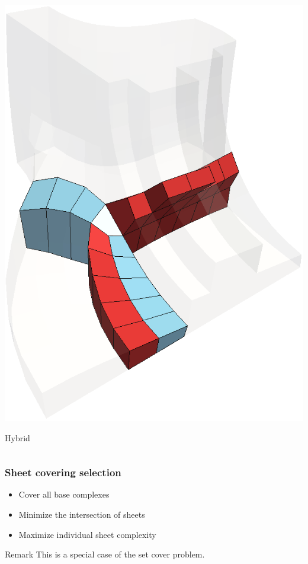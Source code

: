 \documentclass[12pt]{beamer}
\begin{document}
\begin{frame}
\begin{columns}
\begin{column}{0.3\textwidth}
      \includegraphics[width=\textwidth]{./images/sheet-hybrid.png}
      \begin{center}Hybrid\end{center}
    \end{column}
  \end{columns}
\end{frame}

\begin{frame}
  \frametitle{Sheet covering selection}

  \begin{itemize}
    \item Cover all base complexes
    \item Minimize the intersection of sheets
    \item Maximize individual sheet complexity
  \end{itemize}

  \begin{block}{Remark}
    This is a special case of the set cover problem.
  \end{block}
\end{frame}
\end{document}
